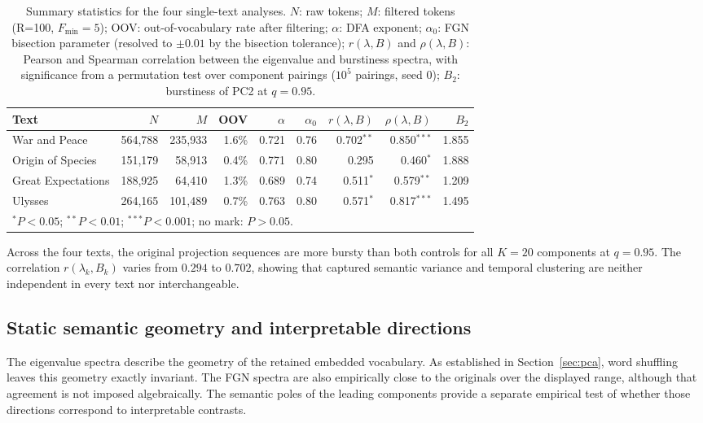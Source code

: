 \documentclass[12pt,a4paper]{article}
\begin{document}
\begin{table}[htbp]
\centering
\caption{Summary statistics for the four single-text analyses.
$N$: raw tokens; $M$: filtered tokens (R=100, $F_{\min}=5$);
OOV: out-of-vocabulary rate after filtering;
$\alpha$: DFA exponent; $\alpha_0$: FGN bisection parameter
(resolved to $\pm0.01$ by the bisection tolerance);
$r(\lambda, B)$ and $\rho(\lambda, B)$: Pearson and Spearman
correlation between the eigenvalue and burstiness spectra, with
significance from a permutation test over component pairings
($10^5$ pairings, seed 0);
$B_2$: burstiness of PC2 at $q=0.95$.}
\label{tab:single_text_summary}
\small
\begin{tabular}{lrrrrrrrr}
\toprule
Text & $N$ & $M$ & OOV & $\alpha$ & $\alpha_0$ &
      $r(\lambda,B)$ & $\rho(\lambda,B)$ & $B_2$ \\
\midrule
War and Peace      & 564{,}788 & 235{,}933 & 1.6\% &
  0.721 & 0.76 & 0.702$^{**}$ & 0.850$^{***}$ & 1.855 \\
Origin of Species  & 151{,}179 &  58{,}913 & 0.4\% &
  0.771 & 0.80 & 0.295         & 0.460$^{*}$   & 1.888 \\
Great Expectations & 188{,}925 &  64{,}410 & 1.3\% &
  0.689 & 0.74 & 0.511$^{*}$   & 0.579$^{**}$  & 1.209 \\
Ulysses            & 264{,}165 & 101{,}489 & 0.7\% &
  0.763 & 0.80 & 0.571$^{*}$   & 0.817$^{***}$ & 1.495 \\
\bottomrule
\multicolumn{9}{l}{\small $^*P<0.05$;\; $^{**}P<0.01$;\;
  $^{***}P<0.001$;\; no mark: $P>0.05$.}
\end{tabular}
\end{table}

Across the four texts, the original projection sequences are more
bursty than both controls for all $K=20$ components at $q=0.95$. The
correlation $r(\lambda_k,B_k)$ varies from $0.294$ to $0.702$, showing
that captured semantic variance and temporal clustering are neither
independent in every text nor interchangeable.

\subsection{Static semantic geometry and interpretable directions}
\label{sec:semantic_geometry_results}

The eigenvalue spectra describe the geometry of the retained embedded
vocabulary. As established in Section~\ref{sec:pca}, word shuffling
leaves this geometry exactly invariant. The FGN spectra are also
empirically close to the originals over the displayed range, although
that agreement is not imposed algebraically. The semantic poles of the
leading components provide a separate empirical test of whether those
directions correspond to interpretable contrasts.
\end{document}

